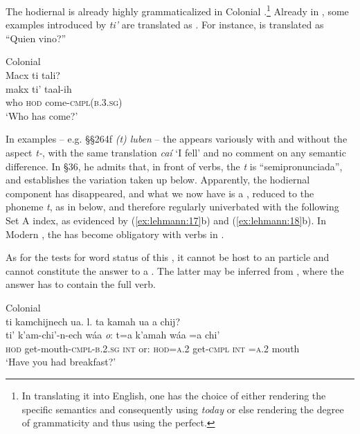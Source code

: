 \documentclass[output=paper]{langsci/langscibook}
\begin{document}
The hodiernal  is already highly grammaticalized in Colonial  .\footnote{In translating it into English, one has the choice of either rendering the specific semantics and consequently using \textit{today} or else rendering the degree of grammaticity and thus using the perfect.} Already in \citet{Coronel1620}, some  examples introduced by \textit{ti’} are translated as . For instance,  is translated as “Quien vino?”

\ea\label{ex:lehmann:19}
Colonial  \\
      Macx   ti     tali?\\
\gll  makx  ti’    taal-ih\\
who    \textsc{hod}  come-\textsc{cmpl(b.3.sg)}\\
\glt ‘Who has come?’ \citep[48]{Coronel1620}
\z

In  examples – e.g. §§264f \textit{(t) luben} – the  appears variously with and without the aspect  \textit{t-}, with the same  translation \textit{caí} ‘I fell’ and no comment on any semantic difference. In §36, he admits that, in front of  verbs, the \textit{t} is “semipronunciada”, and establishes the variation taken up below. Apparently, the hodiernal component has disappeared, and what we now have is a  , reduced to the phoneme \textit{t}, as in  below, and therefore regularly univerbated with the following  Set A index, as evidenced by (\ref{ex:lehmann:17}b) and (\ref{ex:lehmann:18}b). In Modern , the   has become obligatory with  verbs in .


As for the tests for word status of this , it cannot be host to an  particle and cannot constitute the answer to a . The latter may be inferred from , where the answer has to contain the full verb.\newpage


\ea\label{ex:lehmann:20} \let\eachwordone=\small \let\eachwordtwo=\small
Colonial  \\
\ea
ti      kamchijnech          ua.    l.    ta        kamah      ua  a      chij?\\
\gll   ti'     k'am-chi'-n-ech         wáa     \textit{o}:   t=a       k'amah   wáa   =a     chi'\\
\textsc{hod}    get-mouth-\textsc{cmpl-b.2.sg }    \textsc{int}    or:  \textsc{hod=a.2}  get-\textsc{cmpl}   \textsc{int}   \textsc{=a}.2    mouth \\
\glt ‘Have you had breakfast?’
\end{document}
